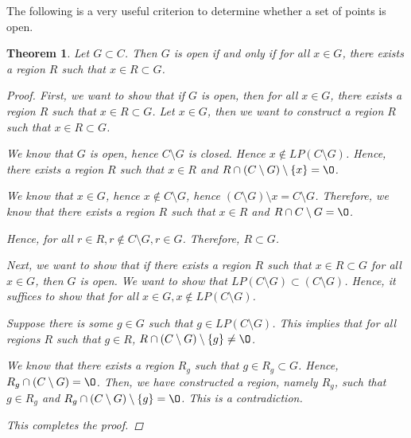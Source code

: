 \documentclass[11pt]{article}
\renewcommand{\emptyset}{\O}
\renewcommand{\_}[1]{\underline{ #1 }}
\newtheorem{theorem}{Theorem}[section]
\theoremstyle{definition}
\numberwithin{equation}{subsection}
\begin{document}
The following is a very useful criterion to determine whether a set of points is open.

\begin{theorem}\label{thm:openchar}  Let $G \subset C$.  Then $G$ is open if and only if for all $x \in G$, there exists a region $R$ such that $x \in R \subset G$.
\begin{proof}
First, we want to show that if $G$ is open, then for all $x \in G$, there exists a region $R$ such that $x \in R \subset G$. Let $x \in G$, then we want to construct a region $R$ such that $x \in R \subset G$.

We know that $G$ is open, hence $C \setminus G$ is closed. Hence $x \notin LP(C \setminus G)$. Hence, there exists a region $R$ such that $x \in R$ and $R \cap (C \setminus G) \setminus \{x\} = \emptyset$. 

We know that $x \in G$, hence $x \notin C \setminus G$, hence $(C \setminus G) \setminus x = C \setminus G$. Therefore, we know that there exists a region $R$ such that $x \in R$ and $R \cap C \setminus G = \emptyset$. 

Hence, for all $r \in R, r \notin C \setminus G, r \in G$. Therefore, $R \subset G$.

Next, we want to show that if there exists a region $R$ such that $x \in R \subset G$ for all $x \in G$, then $G$ is open. We want to show that $LP(C \setminus G) \subset (C \setminus G)$. Hence, it suffices to show that for all $x \in G, x \notin LP(C \setminus G)$.

Suppose there is some $g \in G$ such that $g \in LP(C \setminus G)$. This implies that for all regions $R$ such that $g \in R$, $R \cap (C \setminus G) \setminus \{g\} \not = \emptyset$.

We know that there exists a region $R_g$ such that $g \in R_g \subset G$. Hence, $R_g \cap (C \setminus G) = \emptyset$. Then, we have constructed a region, namely $R_g$, such that $g \in R_g$ and $R_g \cap (C \setminus G) \setminus \{g\} = \emptyset$. This is a contradiction.

This completes the proof.

\renewcommand\qedsymbol{QED}
\end{proof}
\end{theorem}
\end{document}
